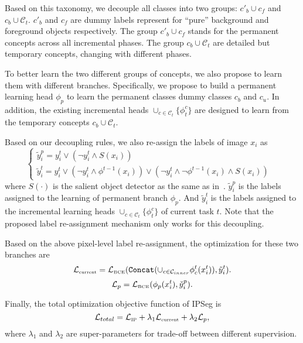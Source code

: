 Based on this taxonomy, we decouple all classes into two groups: $c'_b \cup c_f$ and $c_b \cup \mathcal{C}_t$. $c'_b$ and $c_f$ are dummy labels represent for ``pure'' background and foreground objects respectively. The group $c'_b \cup c_f$ stands for the permanent concepts across all incremental phases. The group $c_b \cup \mathcal{C}_t$ are detailed but temporary concepts, changing with different phases. 

To better learn the two different groups of concepts, we also propose to learn them with different branches. Specifically, we propose to build a permanent learning head $\phi_p$ to learn the permanent classes dummy classes $c_b$ and $c_u$. In addition, the existing incremental heads $\cup_{c\in\mathcal{C}_t}\{\phi_t^c\}$ are designed to learn from the temporary concepts $c_b \cup \mathcal{C}_t$.

Based on our decoupling rules, we also re-assign the labels of image $x_i$ as 
\begin{equation}
    \left\{
    \begin{array}{l}
    \tilde{y}_{i}^{p} = y_i^t \vee (\neg y_i^t \wedge S(x_i))     &  \\
    \tilde{y}_{i}^{t} = y_i^t \vee (\neg y_i^t \wedge \phi^{t-1}(x_i)) \vee (\neg y_i^t \wedge \neg \phi^{t-1}(x_i) \wedge S(x_i))     & 
    \end{array}
    \right.
\end{equation}
where $S(\cdot)$ is the salient object detector as the same as in~\citep{}. $\tilde{y}_{i}^{p}$ is the labels assigned to the learning of permanent branch $\phi_p$. And $\tilde{y}_{i}^{t}$ is the labels assigned to the incremental learning heads $\cup_{c\in\mathcal{C}_t}\{\phi_t^c\}$ of current task $t$. Note that the proposed label re-assignment mechanism only works for this decoupling.

Based on the above pixel-level label re-assignment, the optimization for these two branches are 
\begin{equation}
    \mathcal{L}_{\text{\tiny current}} = \mathcal{L}_{\text{\tiny BCE}}(\texttt{Concat}(\cup_{c \in \mathcal{C}_{inner}} \phi_c^t(x_i^t)), \tilde{y}_i^t).
\end{equation}
\begin{equation}
    \mathcal{L}_{p} = \mathcal{L}_{\text{\tiny BCE}}(\phi_p(x_i^t), \check{y}_i^p).
\end{equation}

Finally, the total optimization objective function of IPSeg is 
\begin{equation}
    \mathcal{L}_{total}=\mathcal{L}_{\text{\tiny IP}}+\lambda_{1}\mathcal{L}_{\text{\tiny current}}+\lambda_{2}\mathcal{L}_{p},
\end{equation}
where $\lambda_1$ and $\lambda_2$ are super-parameters for trade-off between different supervision.
\fi


